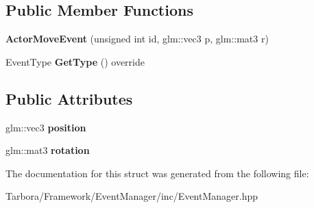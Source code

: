 \subsection*{Public Member Functions}
\begin{DoxyCompactItemize}
\item 
\mbox{\label{structTarbora_1_1ActorMoveEvent_ae72cfc97590599792068495a727790e7}} 
{\bfseries Actor\+Move\+Event} (unsigned int id, glm\+::vec3 p, glm\+::mat3 r)
\item 
\mbox{\label{structTarbora_1_1ActorMoveEvent_abae756ffd82c60ed54c36515600e17bc}} 
Event\+Type {\bfseries Get\+Type} () override
\end{DoxyCompactItemize}
\subsection*{Public Attributes}
\begin{DoxyCompactItemize}
\item 
\mbox{\label{structTarbora_1_1ActorMoveEvent_af646d2e73c7c01fb54247f3cfbac36d8}} 
glm\+::vec3 {\bfseries position}
\item 
\mbox{\label{structTarbora_1_1ActorMoveEvent_ae15601912f958920f60de60776b4272b}} 
glm\+::mat3 {\bfseries rotation}
\end{DoxyCompactItemize}


The documentation for this struct was generated from the following file\+:\begin{DoxyCompactItemize}
\item 
Tarbora/\+Framework/\+Event\+Manager/inc/Event\+Manager.\+hpp\end{DoxyCompactItemize}
